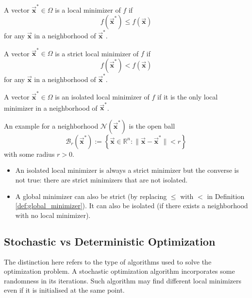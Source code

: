 \documentclass[9pt, headings=standardclasses, parskip=half]{scrartcl}
\renewcommand{\emph}[1]{\textcolor{mypurple}{#1}}
\newcommand{\vect}[1]{\vec{\boldsymbol{#1}}}
\begin{document}
\begin{definition}\label{def:local_minimizer}
A vector \(\vect{x}^{*}\in\Omega\) is a \emph{local minimizer} of \(f\) if
\[
f(\vect{x}^{*})\leq f(\vect{x})
\]
for any \(\vect{x}\) in a neighborhood of \(\vect{x}^{*}\).
\end{definition}

\begin{definition}\label{def:strict_local_minimizer}
A vector \(\vect{x}^{*}\in\Omega\) is a \emph{strict local minimizer} of \(f\) if
\[
f(\vect{x}^{*})<f(\vect{x})
\]
for any \(\vect{x}\) in a neighborhood of \(\vect{x}^{*}\).
\end{definition}

\begin{definition}
A vector \(\vect{x}^{*}\in\Omega\) is an \emph{isolated local minimizer} of \(f\) if it is the only local minimizer in a neighborhood of \(\vect{x}^{*}\).
\end{definition}


\begin{remark}
  An example for a neighborhood \(\mathcal{N}(\vect{x}^{*})\) is the open ball
\[
\mathcal{B}_{r}(\vect{x}^{*}) := \left\{ \vect{x}\in\mathbb{R}^{n} : \|\vect{x}-\vect{x}^{*}\|<r \right\}
\]
with some radius \(r>0\).
\end{remark}

\begin{remark}\leavevmode %
\begin{itemize}
  \item An isolated local minimizer is always a strict minimizer but the converse is not true: there are strict minimizers that are not isolated.
  \item A global minimizer can also be strict (by replacing \(\leq\) with \(<\) in Definition \ref{def:global_minimizer}). It can also be isolated (if there exists a neighborhood with no local minimizer).\qedhere
\end{itemize}
\end{remark}


\subsection{Stochastic vs Deterministic Optimization}

The distinction here refers to the type of algorithms used to solve the optimization problem. 
A stochastic optimization algorithm incorporates some randomness in its iterations. 
Such algorithm may find different local minimizers even if it is initialised at the same point.
\end{document}
